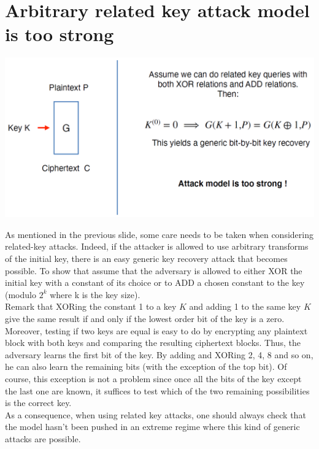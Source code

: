 \section{Arbitrary related key attack model is too strong}
	\begin{center}
		\includegraphics[width=140mm]{Graphics/Cryptanalysis/c9.png}
	\end{center}
	As mentioned in the previous slide, some care needs to be taken when considering related-key attacks. 
	Indeed, if the attacker is allowed to use arbitrary transforms of the initial key, there is an easy generic key recovery attack that becomes possible. 
	To show that assume that the adversary is allowed to either XOR the initial key with a constant of its choice or to ADD a chosen constant to the key (modulo $2^k$ where k is the key size).\\
	Remark that XORing the constant 1 to a key $K$ and adding 1 to the same key $K$ give the same result if and only if the lowest order bit of the key is a zero. 
	Moreover, testing if two keys are equal is easy to do by encrypting any plaintext block with both keys and comparing the resulting ciphertext blocks. 
	Thus, the adversary learns the first bit of the key. 
	By adding and XORing 2, 4, 8 and so on, he can also learn the remaining bits (with the exception of the top bit). 
	Of course, this exception is not a problem since once all the bits of the key except the last one are known, it suffices to test which of the two remaining possibilities is the correct key.\\
	As a consequence, when using related key attacks, one should always check that the model hasn’t been pushed in an extreme regime where this kind of generic attacks are possible.





























